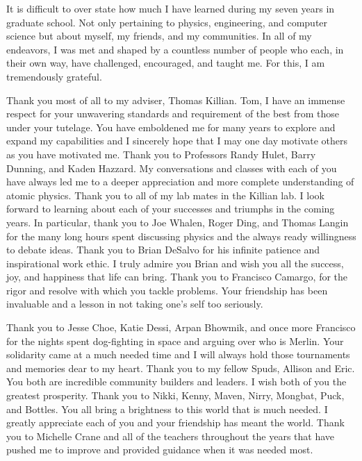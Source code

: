 \begin{acknowledge}
It is difficult to over state how much I have learned during my seven years in graduate school.
Not only pertaining to physics, engineering, and computer science but about myself, my friends, and my communities.
In all of my endeavors, I was met and shaped by a countless number of people who each, in their own way, have challenged, encouraged, and taught me.
For this, I am tremendously grateful.

Thank you most of all to my adviser, Thomas Killian.
Tom, I have an immense respect for your unwavering standards and requirement of the best from those under your tutelage.
You have emboldened me for many years to explore and expand my capabilities and I sincerely hope that I may one day motivate others as you have motivated me.
Thank you to Professors Randy Hulet, Barry Dunning, and Kaden Hazzard.
My conversations and classes with each of you have always led me to a deeper appreciation and more complete understanding of atomic physics.
Thank you to all of my lab mates in the Killian lab.
I look forward to learning about each of your successes and triumphs in the coming years.
In particular, thank you to Joe Whalen, Roger Ding, and Thomas Langin for the many long hours spent discussing physics and the always ready willingness to debate ideas.
Thank you to Brian DeSalvo for his infinite patience and inspirational work ethic.
I truly admire you Brian and wish you all the success, joy, and happiness that life can bring.
Thank you to Francisco Camargo, for the rigor and resolve with which you tackle problems.
Your friendship has been invaluable and a lesson in not taking one's self too seriously.

Thank you to Jesse Choe, Katie Dessi, Arpan Bhowmik, and once more Francisco for the nights spent dog-fighting in space and arguing over who is Merlin.
Your solidarity came at a much needed time and I will always hold those tournaments and memories dear to my heart.
Thank you to my fellow Spuds, Allison and Eric.
You both are incredible community builders and leaders.
I wish both of you the greatest prosperity.
Thank you to Nikki, Kenny, Maven, Nirry, Mongbat, Puck, and Bottles. 
You all bring a brightness to this world that is much needed. 
I greatly appreciate each of you and your friendship has meant the world.
Thank you to Michelle Crane and all of the teachers throughout the years that have pushed me to improve and provided guidance when it was needed most.


\end{acknowledge}
